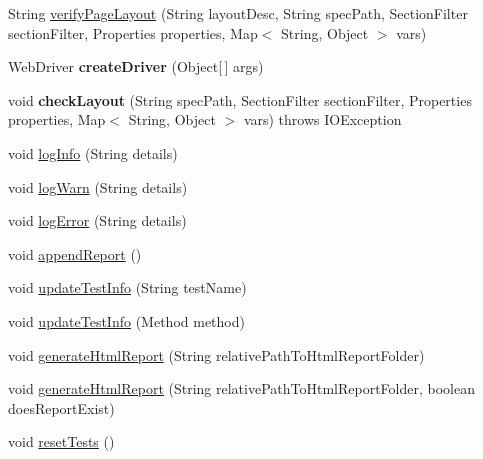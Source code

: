 \begin{DoxyCompactItemize}
\item 
String \hyperlink{classcom_1_1zeuslearning_1_1automation_1_1selenium_1_1interactions_1_1BrowserWindow_a6ba5b713c0e737f827cb9eda0299b059}{verify\+Page\+Layout} (String layout\+Desc, String spec\+Path, Section\+Filter section\+Filter, Properties properties, Map$<$ String, Object $>$ vars)
\item 
\hypertarget{classcom_1_1zeuslearning_1_1automation_1_1selenium_1_1interactions_1_1BrowserWindow_a571ac3e9df395d73bfbf6b49d8824e8b}{}\label{classcom_1_1zeuslearning_1_1automation_1_1selenium_1_1interactions_1_1BrowserWindow_a571ac3e9df395d73bfbf6b49d8824e8b} 
Web\+Driver {\bfseries create\+Driver} (Object\mbox{[}$\,$\mbox{]} args)
\item 
\hypertarget{classcom_1_1zeuslearning_1_1automation_1_1selenium_1_1interactions_1_1BrowserWindow_aa2e6ac205e54331a1656f8a102883e18}{}\label{classcom_1_1zeuslearning_1_1automation_1_1selenium_1_1interactions_1_1BrowserWindow_aa2e6ac205e54331a1656f8a102883e18} 
void {\bfseries check\+Layout} (String spec\+Path, Section\+Filter section\+Filter, Properties properties, Map$<$ String, Object $>$ vars)  throws I\+O\+Exception 
\item 
void \hyperlink{classcom_1_1zeuslearning_1_1automation_1_1selenium_1_1interactions_1_1BrowserWindow_a39c9a28e17c925a56f2948dee5b9d00e}{log\+Info} (String details)
\item 
void \hyperlink{classcom_1_1zeuslearning_1_1automation_1_1selenium_1_1interactions_1_1BrowserWindow_ac1a4682b2ae296ccc8ce7c10bf0f48d0}{log\+Warn} (String details)
\item 
void \hyperlink{classcom_1_1zeuslearning_1_1automation_1_1selenium_1_1interactions_1_1BrowserWindow_a27fd367a5ca47cd73865863373b608e8}{log\+Error} (String details)
\item 
void \hyperlink{classcom_1_1zeuslearning_1_1automation_1_1selenium_1_1interactions_1_1BrowserWindow_a2a3afd6b5229d2bfaecbccd92b8a4fe9}{append\+Report} ()
\item 
void \hyperlink{classcom_1_1zeuslearning_1_1automation_1_1selenium_1_1interactions_1_1BrowserWindow_ac5cee2e884ceca2b0d7367e40aff6942}{update\+Test\+Info} (String test\+Name)
\item 
void \hyperlink{classcom_1_1zeuslearning_1_1automation_1_1selenium_1_1interactions_1_1BrowserWindow_a7cc2714d601bc96f3d9262b662b27a2e}{update\+Test\+Info} (Method method)
\item 
void \hyperlink{classcom_1_1zeuslearning_1_1automation_1_1selenium_1_1interactions_1_1BrowserWindow_a72167c76169cf3c9b4d270da983f5036}{generate\+Html\+Report} (String relative\+Path\+To\+Html\+Report\+Folder)
\item 
void \hyperlink{classcom_1_1zeuslearning_1_1automation_1_1selenium_1_1interactions_1_1BrowserWindow_a0b6b11b00f45f4b78455962d6b33b33f}{generate\+Html\+Report} (String relative\+Path\+To\+Html\+Report\+Folder, boolean does\+Report\+Exist)
\item 
void \hyperlink{classcom_1_1zeuslearning_1_1automation_1_1selenium_1_1interactions_1_1BrowserWindow_aeed389e302169c0d1e6aae40e395fa68}{reset\+Tests} ()
\end{DoxyCompactItemize}
